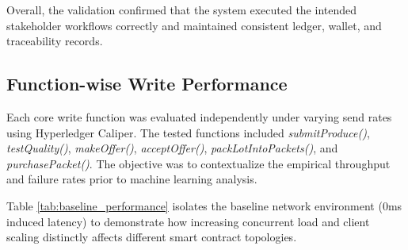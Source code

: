 \documentclass[manuscript,screen,nofonts]{acmart}
\begin{document}
	
Overall, the validation confirmed that the system executed the intended stakeholder workflows correctly and maintained consistent ledger, wallet, and traceability records.
	
	
	
	
	

\subsection{Function-wise Write Performance}

Each core write function was evaluated independently under varying send rates using Hyperledger Caliper. The tested functions included \textit{submitProduce()}, \textit{testQuality()}, \textit{makeOffer()}, \textit{acceptOffer()}, \textit{packLotIntoPackets()}, and \textit{purchasePacket()}. The objective was to contextualize the empirical throughput and failure rates prior to machine learning analysis.

Table \ref{tab:baseline_performance} isolates the baseline network environment (0ms induced latency) to demonstrate how increasing concurrent load and client scaling distinctly affects different smart contract topologies. 
\end{document}
